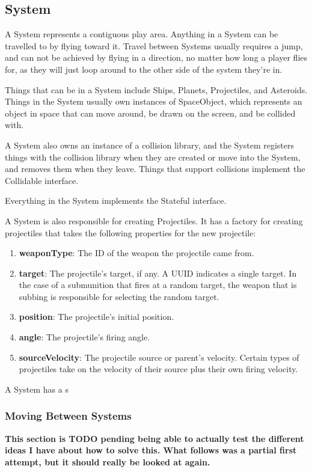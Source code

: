 \documentclass{article}
\begin{document}
\subsection{System}
A System represents a contiguous play area. Anything in a System can be travelled to by flying toward it. Travel between Systems usually requires a jump, and can not be achieved by flying in a direction, no matter how long a player flies for, as they will just loop around to the other side of the system they're in.

Things that can be in a System include Ships, Planets, Projectiles, and Asteroids. Things in the System usually own instances of SpaceObject, which represents an object in space that can move around, be drawn on the screen, and be collided with. 

A System also owns an instance of a collision library, and the System registers things with the collision library when they are created or move into the System, and removes them when they leave. Things that support collisions implement the Collidable interface.

Everything in the System implements the Stateful interface.

A System is also responsible for creating Projectiles. It has a factory for creating projectiles that takes the following properties for the new projectile:
\begin{enumerate}
\item[] \textbf{weaponType}: The ID of the weapon the projectile came from.
\item[] \textbf{target}: The projectile's target, if any. A UUID indicates a single target. In the case of a submunition that fires at a random target, the weapon that is subbing is responsible for selecting the random target.
\item[] \textbf{position}: The projectile's initial position.
\item[] \textbf{angle}: The projectile's firing angle.
\item[] \textbf{sourceVelocity}: The projectile source or parent's velocity. Certain types of projectiles take on the velocity of their source plus their own firing velocity.
\end{enumerate}

A System has a s

\subsubsection{Moving Between Systems}
\textbf{This section is TODO pending being able to actually test the different ideas I have about how to solve this. What follows was a partial first attempt, but it should really be looked at again.}
\end{document}
